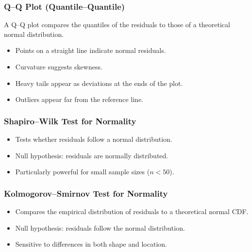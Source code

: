 \documentclass[11pt,a4paper]{article}
\begin{document}
\subsubsection{Q--Q Plot (Quantile--Quantile)}

A Q--Q plot compares the quantiles of the residuals to those of a theoretical normal distribution.

\begin{itemize}
    \item Points on a straight line indicate normal residuals.
    \item Curvature suggests skewness.
    \item Heavy tails appear as deviations at the ends of the plot.
    \item Outliers appear far from the reference line.
\end{itemize}

\subsubsection{Shapiro--Wilk Test for Normality}

\begin{itemize}
    \item Tests whether residuals follow a normal distribution.
    \item Null hypothesis: residuals are normally distributed.
    \item Particularly powerful for small sample sizes ($n < 50$).
\end{itemize}

\subsubsection{Kolmogorov--Smirnov Test for Normality}

\begin{itemize}
    \item Compares the empirical distribution of residuals to a theoretical normal CDF.
    \item Null hypothesis: residuals follow the normal distribution.
    \item Sensitive to differences in both shape and location.
\end{itemize}

\end{document}
